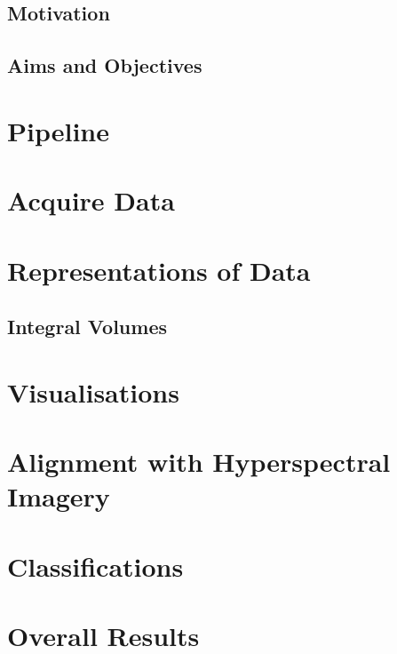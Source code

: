 \documentclass{article}
\begin{document}
		\subsection{Motivation} \label{Motivation}
				
		\subsection{Aims and Objectives}\label{Aims}
			
			
    \section{Pipeline}\label{Pipeline}
	    
	    \newpage
    \section{Acquire Data}\label{AcquireData}
	    
	    \newpage
    \section{Representations of Data}\label{Representations}
	    
	    \newpage
		 \subsection{Integral Volumes}\label{Rep_IntegralVolumes}
		 	
		 		\newpage
		 		
	\section{Visualisations}\label{Visualisations}
		
		\newpage
	\section{Alignment with Hyperspectral Imagery}\label{Alignment}
		
		\newpage		
	\section{Classifications}\label{Classifications}
		
		\newpage
	\section{Overall Results}\label{Results}
		
		\newpage
\end{document}
